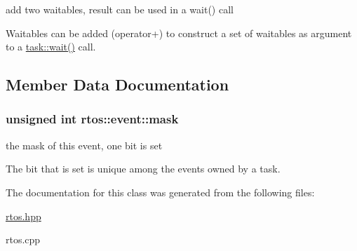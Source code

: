 add two waitables, result can be used in a wait() call 

Waitables can be added (operator+) to construct a \textquotesingle{}set of waitables\textquotesingle{} as argument to a \hyperlink{classrtos_1_1task__base_a32c6e19fe3d25a38587964defdb52ddc}{task\+::wait()} call. 

\subsection{Member Data Documentation}
\subsubsection[{\texorpdfstring{mask}{mask}}]{\setlength{\rightskip}{0pt plus 5cm}unsigned int rtos\+::event\+::mask\hspace{0.3cm}{\ttfamily [protected]}}\hypertarget{classrtos_1_1event_aa6e6f66f74b4f1523e456d34dd7a1704}{}\label{classrtos_1_1event_aa6e6f66f74b4f1523e456d34dd7a1704}


the mask of this event, one bit is set 

The bit that is set is unique among the events owned by a task. 

The documentation for this class was generated from the following files\+:\begin{DoxyCompactItemize}
\item 
\hyperlink{rtos_8hpp}{rtos.\+hpp}\item 
rtos.\+cpp\end{DoxyCompactItemize}
